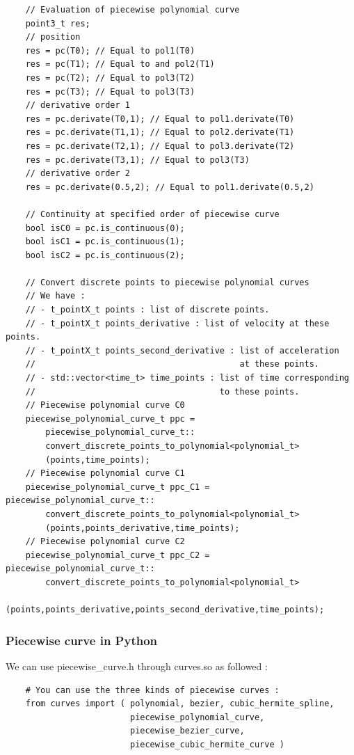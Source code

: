 \documentclass{article}
\begin{document}
\begin{lstlisting}
    // Evaluation of piecewise polynomial curve
    point3_t res;
    // position
    res = pc(T0); // Equal to pol1(T0)
    res = pc(T1); // Equal to and pol2(T1)
    res = pc(T2); // Equal to pol3(T2)
    res = pc(T3); // Equal to pol3(T3)
    // derivative order 1
    res = pc.derivate(T0,1); // Equal to pol1.derivate(T0)
    res = pc.derivate(T1,1); // Equal to pol2.derivate(T1)
    res = pc.derivate(T2,1); // Equal to pol3.derivate(T2)
    res = pc.derivate(T3,1); // Equal to pol3(T3)
    // derivative order 2
    res = pc.derivate(0.5,2); // Equal to pol1.derivate(0.5,2)
    
    // Continuity at specified order of piecewise curve
    bool isC0 = pc.is_continuous(0);
    bool isC1 = pc.is_continuous(1);
    bool isC2 = pc.is_continuous(2);
    
    // Convert discrete points to piecewise polynomial curves
    // We have : 
    // - t_pointX_t points : list of discrete points.
    // - t_pointX_t points_derivative : list of velocity at these points.
    // - t_pointX_t points_second_derivative : list of acceleration 
    //                                         at these points.
    // - std::vector<time_t> time_points : list of time corresponding 
    //                                     to these points.
    // Piecewise polynomial curve C0
    piecewise_polynomial_curve_t ppc = 
        piecewise_polynomial_curve_t::
        convert_discrete_points_to_polynomial<polynomial_t>
        (points,time_points);
    // Piecewise polynomial curve C1
    piecewise_polynomial_curve_t ppc_C1 =  piecewise_polynomial_curve_t::
        convert_discrete_points_to_polynomial<polynomial_t>
        (points,points_derivative,time_points);
    // Piecewise polynomial curve C2
    piecewise_polynomial_curve_t ppc_C2 =  piecewise_polynomial_curve_t::
        convert_discrete_points_to_polynomial<polynomial_t>
        (points,points_derivative,points_second_derivative,time_points);
    \end{lstlisting}
    
    \subsubsection{Piecewise curve in Python}
    We can use piecewise\_curve.h through curves.so as followed :
    \begin{lstlisting}
    # You can use the three kinds of piecewise curves :
    from curves import ( polynomial, bezier, cubic_hermite_spline,
                         piecewise_polynomial_curve, 
                         piecewise_bezier_curve,
                         piecewise_cubic_hermite_curve )
    \end{lstlisting}
    
\end{document}
